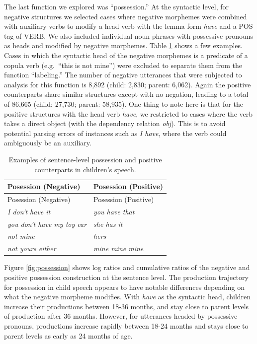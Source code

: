 \documentclass[
  english,
  man,floatsintext]{apa6}
\begin{document}
The last function we explored was ``possession.'' At the syntactic level, for negative structures we selected cases where negative morphemes were combined with auxiliary verbs to modify a head verb with the lemma form \emph{have} and a POS tag of VERB. We also included individual noun phrases with possessive pronouns as heads and modified by negative morphemes. Table \ref{tab:possess} shows a few examples. Cases in which the syntactic head of the negative morphemes is a predicate of a copula verb (e.g.~``this is not mine'') were excluded to separate them from the function ``labeling.'' The number of negative utterances that were subjected to analysis for this function is 8,892 (child: 2,830; parent: 6,062). Again the positive counterparts share similar structures except with no negation, leading to a total of 86,665 (child: 27,730; parent: 58,935). One thing to note here is that for the positive structures with the head verb \emph{have}, we restricted to cases where the verb takes a direct object (with the dependency relation \emph{obj}). This is to avoid potential parsing errors of instances such as \emph{I have}, where the verb could ambiguously be an auxiliary.

\begin{longtable}[]{@{}ll@{}}
\caption{\label{tab:possess} Examples of sentence-level possession and positive counterparts in children's speech.}\tabularnewline
\toprule
Posession (Negative) & Posession (Positive) \\
\midrule
\endfirsthead
\toprule
Posession (Negative) & Posession (Positive) \\
\midrule
\endhead
\emph{I don't have it} & \emph{you have that} \\
\emph{you don't have my toy car} & \emph{she has it} \\
\emph{not mine} & \emph{hers} \\
\emph{not yours either} & \emph{mine mine mine} \\
\bottomrule
\end{longtable}

Figure \ref{fig:possession} shows log ratios and cumulative ratios of the negative and positive possession construction at the sentence level. The production trajectory for possession in child speech appears to have notable differences depending on what the negative morpheme modifies. With \emph{have} as the syntactic head, children increase their productions between 18-36 months, and stay close to parent levels of production after 36 months. However, for utterances headed by possessive pronouns, productions increase rapidly between 18-24 months and stays close to parent levels as early as 24 months of age.
\end{document}
